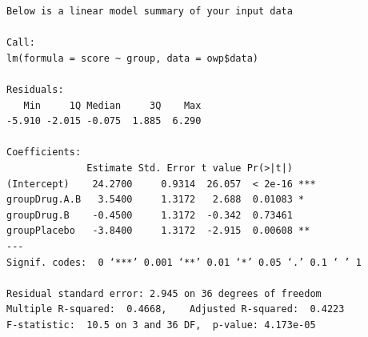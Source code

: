 \begin{frame}
\begin{enumerate}
\begin{verbatim}
Below is a linear model summary of your input data

Call:
lm(formula = score ~ group, data = owp$data)

Residuals:
   Min     1Q Median     3Q    Max 
-5.910 -2.015 -0.075  1.885  6.290 

Coefficients:
              Estimate Std. Error t value Pr(>|t|)    
(Intercept)    24.2700     0.9314  26.057  < 2e-16 ***
groupDrug.A.B   3.5400     1.3172   2.688  0.01083 *  
groupDrug.B    -0.4500     1.3172  -0.342  0.73461    
groupPlacebo   -3.8400     1.3172  -2.915  0.00608 ** 
---
Signif. codes:  0 ‘***’ 0.001 ‘**’ 0.01 ‘*’ 0.05 ‘.’ 0.1 ‘ ’ 1

Residual standard error: 2.945 on 36 degrees of freedom
Multiple R-squared:  0.4668,	Adjusted R-squared:  0.4223 
F-statistic:  10.5 on 3 and 36 DF,  p-value: 4.173e-05

\end{verbatim}
  \end{enumerate}
\end{frame}

